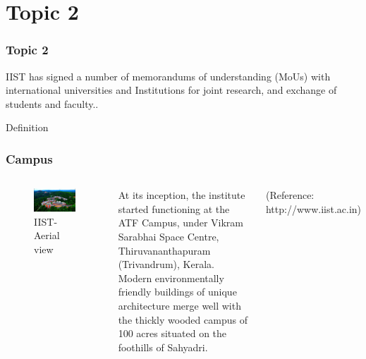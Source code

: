 \documentclass[hyperref={bookmarks=false},aspectratio=169]{beamer}
\begin{document}
\section{Topic 2}

\begin{frame}
\frametitle{Topic 2 }

IIST has signed a number of memorandums of understanding (MoUs) with international universities and Institutions for joint research, and exchange of  \alert{students and faculty.}.

\begin{block}{Definition}

\end{block}


\end{frame}


\begin{frame}
\frametitle{Campus}

\begin{columns}


\begin{figure}
    \centering
    \includegraphics[width=\columnwidth]{./figures/iist}
    \caption{IIST- Aerial view}
    \label{fig:hollywood_prank}
\end{figure}


At its inception, the institute started functioning at the ATF Campus, under Vikram Sarabhai Space Centre, Thiruvananthapuram (Trivandrum), Kerala. Modern environmentally friendly buildings of unique architecture merge well with the thickly wooded campus of 100 acres situated on the foothills of Sahyadri.

\small{(Reference: http://www.iist.ac.in)}

\end{columns}
\end{frame}
\end{document}
